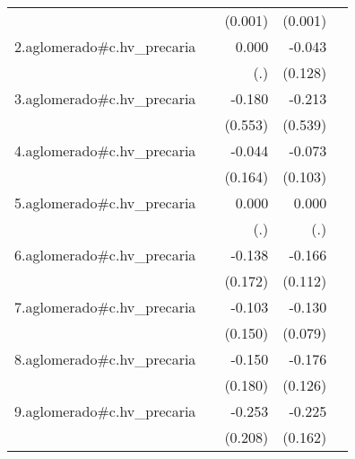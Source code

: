 {\begin{longtable}{l*{4}{D{.}{.}{-1}}}
            &                     &     (0.001)         &     (0.001)         &                     \\
\addlinespace
2.aglomerado#c.hv\_precaria&                     &       0.000         &      -0.043         &                     \\
            &                     &         (.)         &     (0.128)         &                     \\
\addlinespace
3.aglomerado#c.hv\_precaria&                     &      -0.180         &      -0.213         &                     \\
            &                     &     (0.553)         &     (0.539)         &                     \\
\addlinespace
4.aglomerado#c.hv\_precaria&                     &      -0.044         &      -0.073         &                     \\
            &                     &     (0.164)         &     (0.103)         &                     \\
\addlinespace
5.aglomerado#c.hv\_precaria&                     &       0.000         &       0.000         &                     \\
            &                     &         (.)         &         (.)         &                     \\
\addlinespace
6.aglomerado#c.hv\_precaria&                     &      -0.138         &      -0.166         &                     \\
            &                     &     (0.172)         &     (0.112)         &                     \\
\addlinespace
7.aglomerado#c.hv\_precaria&                     &      -0.103         &      -0.130         &                     \\
            &                     &     (0.150)         &     (0.079)         &                     \\
\addlinespace
8.aglomerado#c.hv\_precaria&                     &      -0.150         &      -0.176         &                     \\
            &                     &     (0.180)         &     (0.126)         &                     \\
\addlinespace
9.aglomerado#c.hv\_precaria&                     &      -0.253         &      -0.225         &                     \\
            &                     &     (0.208)         &     (0.162)         &                     \\

\end{longtable}}
